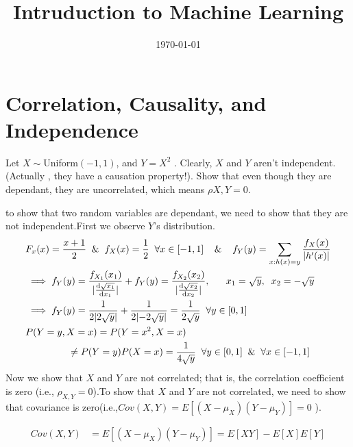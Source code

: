 \documentclass[12pt]{article}
\title{Intruduction to Machine Learning}
\date{\today}
\begin{document}
\maketitlepage
\maketitlestart
\section{Correlation, Causality, and Independence}
Let $X \sim  $Uniform$(-1 , 1)$, and $Y = X^2$
. Clearly, $X$ and $Y$ aren’t independent. (Actually  \nolinebreak[3], they have a causation property!). Show that even though they are dependant, they are uncorrelated, which means $ρX,Y = 0$.
\begin{qsolve}[solution]
    to show that two random variables are dependant, we need to show that they are not independent.First we observe $Y$'s distribution.\\
    \begin{align*}
         & F_{x}(x)      = \frac{x+1}{2} \;\; \& \;\; f_{X}(x) =\frac{1}{2} \;\; \forall x \in [-1,1] \;\;\;\; \& \;\;\;\; f_{Y}(y) = \sum_{x:h(x)=y} \frac{f_X(x)}{\lvert h^{\prime}(x)\rvert}                          \\
         & \implies f_{Y}(y) = \frac{f_{X_{1}}(x_1)}{\lvert \dv{\sqrt{x_1}}{x_1} \rvert} + f_{Y}(y) = \frac{f_{X_{2}}(x_2)}{\lvert \dv{\sqrt{x_2}}{x_2} \rvert}        ,\;\;\;\;\;\; x_1 = \sqrt{y} ,\;\; x_2 =-\sqrt{y} \\
         & \implies f_{Y}(y) = \frac{1}{2\lvert 2\sqrt{y}\rvert} + \frac{1}{2\lvert -2\sqrt{y}\rvert} = \frac{1}{2\sqrt{y}} \;\; \forall y \in [0,1]                                                                     \\
         & P(Y=y , X=x)     = P(Y=x^2 , X=x)                                                                                                                                                                             \\
         & \;\;\;\;\;\;\;\;\;\;\;\;\;\;\;\; \neq P(Y=y)P(X=x) = \frac{1}{4\sqrt{y}} \;\; \forall y \in [0,1] \;\; \& \;\; \forall x \in [-1,1]                                                                           \\
    \end{align*}
    \splitqsolve
    Now we show that $X$ and $Y$ are not correlated; that is, the correlation coefficient is zero (i.e., $\rho_{X,Y} = 0$).To show that $X$ and $Y$ are not correlated, we need to show that covariance is zero(i.e.,$Cov(X,Y) = E[(X-\mu_X)(Y-\mu_Y)] = 0 $ ).\\
    \begin{qsolve}[]
        \begin{align*}
            Cov(X,Y)          & = E[(X-\mu_X)(Y-\mu_Y)] = E[XY] -E[X]E[Y]                                                                                                                                                                        \\

\end{align*}
\end{qsolve}
\end{qsolve}
\end{document}
